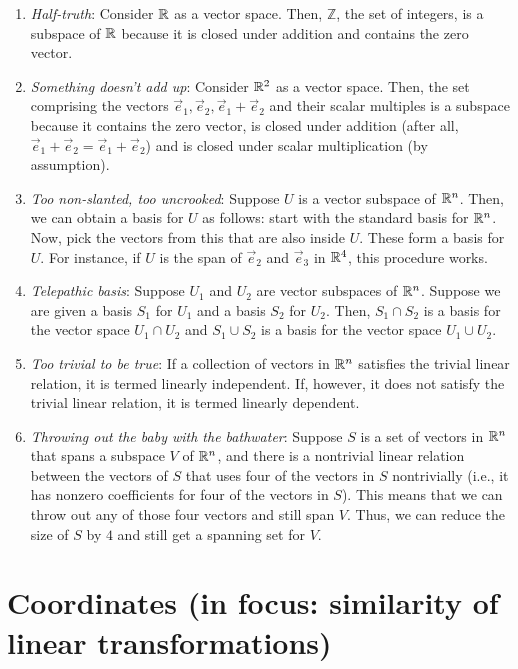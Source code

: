 \documentclass[10pt]{amsart}
\begin{document}
\begin{enumerate}
\item {\em Half-truth}: Consider $\mathbb{R}$ as a vector space. Then,
  $\mathbb{Z}$, the set of integers, is a subspace of $\mathbb{R}$ because it
  is closed under addition and contains the zero vector.
\item {\em Something doesn't add up}: Consider $\mathbb{R}^2$ as a vector
  space. Then, the set comprising the vectors
  $\vec{e}_1,\vec{e}_2,\vec{e}_1 + \vec{e}_2$ and their scalar
  multiples is a subspace because it contains the zero vector, is
  closed under addition (after all, $\vec{e}_1 + \vec{e}_2 = \vec{e}_1
  + \vec{e}_2$) and is closed under scalar multiplication (by
  assumption).
\item {\em Too non-slanted, too uncrooked}: Suppose $U$ is a vector
  subspace of $\mathbb{R}^n$. Then, we can obtain a basis for $U$ as follows:
  start with the standard basis for $\mathbb{R}^n$. Now, pick the vectors from
  this that are also inside $U$. These form a basis for $U$. For
  instance, if $U$ is the span of $\vec{e}_2$ and $\vec{e}_3$ in
  $\mathbb{R}^4$, this procedure works.
\item {\em Telepathic basis}: Suppose $U_1$ and $U_2$ are vector
  subspaces of $\mathbb{R}^n$. Suppose we are given a basis $S_1$ for $U_1$
  and a basis $S_2$ for $U_2$. Then, $S_1 \cap S_2$ is a basis for the
  vector space $U_1 \cap U_2$ and $S_1 \cup S_2$ is a basis for the
  vector space $U_1 \cup U_2$.
\item {\em Too trivial to be true}: If a collection of vectors in
  $\mathbb{R}^n$ satisfies the trivial linear relation, it is termed linearly
  independent. If, however, it does not satisfy the trivial linear
  relation, it is termed linearly dependent.
\item {\em Throwing out the baby with the bathwater}: Suppose $S$ is a
  set of vectors in $\mathbb{R}^n$ that spans a subspace $V$ of $\mathbb{R}^n$, and
  there is a nontrivial linear relation between the vectors of $S$
  that uses four of the vectors in $S$ nontrivially (i.e., it has
  nonzero coefficients for four of the vectors in $S$). This means
  that we can throw out any of those four vectors and still span
  $V$. Thus, we can reduce the size of $S$ by $4$ and still get a
  spanning set for $V$.
\end{enumerate}

\section{Coordinates (in focus: similarity of linear transformations)}
\end{document}
